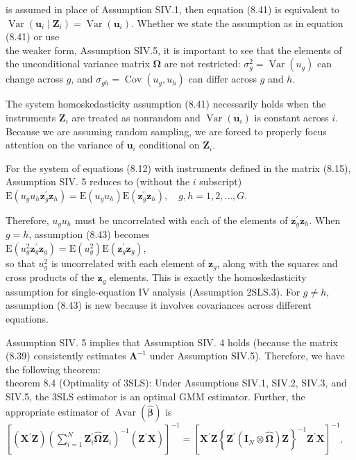 \documentclass[10pt]{article}
\begin{document}
is assumed in place of Assumption SIV.1, then equation (8.41) is equivalent to $\operatorname{Var}\left(\mathbf{u}_{i} \mid \mathbf{Z}_{i}\right)=\operatorname{Var}\left(\mathbf{u}_{i}\right)$. Whether we state the assumption as in equation (8.41) or use\\
the weaker form, Assumption SIV.5, it is important to see that the elements of the unconditional variance matrix $\boldsymbol{\Omega}$ are not restricted: $\sigma_{g}^{2}=\operatorname{Var}\left(u_{g}\right)$ can change across $g$, and $\sigma_{g h}=\operatorname{Cov}\left(u_{g}, u_{h}\right)$ can differ across $g$ and $h$.

The system homoskedasticity assumption (8.41) necessarily holds when the instruments $\mathbf{Z}_{i}$ are treated as nonrandom and $\operatorname{Var}\left(\mathbf{u}_{i}\right)$ is constant across $i$. Because we are assuming random sampling, we are forced to properly focus attention on the variance of $\mathbf{u}_{i}$ conditional on $\mathbf{Z}_{i}$.

For the system of equations (8.12) with instruments defined in the matrix (8.15), Assumption SIV. 5 reduces to (without the $i$ subscript)\\
$\mathrm{E}\left(u_{g} u_{h} \mathbf{z}_{g}^{\prime} \mathbf{z}_{h}\right)=\mathrm{E}\left(u_{g} u_{h}\right) \mathrm{E}\left(\mathbf{z}_{g}^{\prime} \mathbf{z}_{h}\right), \quad g, h=1,2, \ldots, G$.

Therefore, $u_{g} u_{h}$ must be uncorrelated with each of the elements of $\mathbf{z}_{g}^{\prime} \mathbf{z}_{h}$. When $g=h$, assumption (8.43) becomes\\
$\mathrm{E}\left(u_{g}^{2} \mathbf{z}_{g}^{\prime} \mathbf{z}_{g}\right)=\mathrm{E}\left(u_{g}^{2}\right) \mathrm{E}\left(\mathbf{z}_{g}^{\prime} \mathbf{z}_{g}\right)$,\\
so that $u_{g}^{2}$ is uncorrelated with each element of $\mathbf{z}_{g}$, along with the squares and cross products of the $\mathbf{z}_{g}$ elements. This is exactly the homoskedasticity assumption for single-equation IV analysis (Assumption 2SLS.3). For $g \neq h$, assumption (8.43) is new because it involves covariances across different equations.

Assumption SIV. 5 implies that Assumption SIV. 4 holds (because the matrix (8.39) consistently estimates $\boldsymbol{\Lambda}^{-1}$ under Assumption SIV.5). Therefore, we have the following theorem:\\
theorem 8.4 (Optimality of 3SLS): Under Assumptions SIV.1, SIV.2, SIV.3, and SIV.5, the 3SLS estimator is an optimal GMM estimator. Further, the appropriate estimator of $\operatorname{Avar}(\hat{\boldsymbol{\beta}})$ is\\
$\left[\left(\mathbf{X}^{\prime} \mathbf{Z}\right)\left(\sum_{i=1}^{N} \mathbf{Z}_{i}^{\prime} \hat{\mathbf{\Omega}} \mathbf{Z}_{i}\right)^{-1}\left(\mathbf{Z}^{\prime} \mathbf{X}\right)\right]^{-1}=\left[\mathbf{X}^{\prime} \mathbf{Z}\left\{\mathbf{Z}^{\prime}\left(\mathbf{I}_{N} \otimes \hat{\mathbf{\Omega}}\right) \mathbf{Z}\right\}^{-1} \mathbf{Z}^{\prime} \mathbf{X}\right]^{-1}$.
\end{document}
